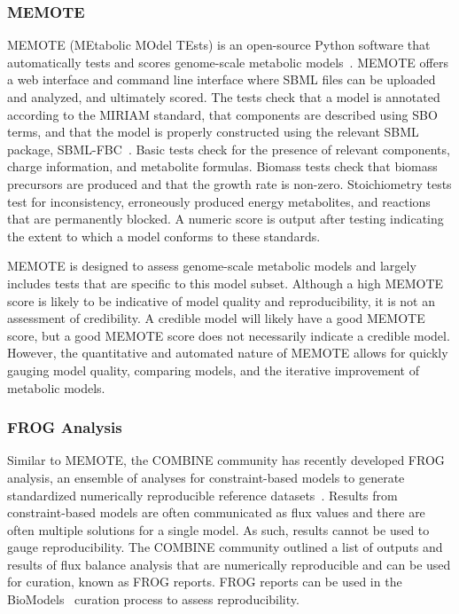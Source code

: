 \documentclass[12pt]{report}
\begin{document}
\subsubsection{MEMOTE}
MEMOTE (MEtabolic MOdel TEsts) is an open-source Python software that automatically tests and scores genome-scale metabolic models~\cite{Lieven2020-kj}. MEMOTE offers a web interface and command line interface where SBML files can be uploaded and analyzed, and ultimately scored. The tests check that a model is annotated according to the MIRIAM standard, that components are described using SBO terms, and that the model is properly constructed using the relevant SBML package, SBML-FBC~\cite{Lieven2020-kj, Olivier2018-tx}. Basic tests check for the presence of relevant components, charge information, and metabolite formulas. Biomass tests check that biomass precursors are produced and that the growth rate is non-zero. Stoichiometry tests test for inconsistency, erroneously produced energy metabolites, and reactions that are permanently blocked. A numeric score is output after testing indicating the extent to which a model conforms to these standards.

MEMOTE is designed to assess genome-scale metabolic models and largely includes tests that are specific to this model subset. Although a high MEMOTE score is likely to be indicative of model quality and reproducibility, it is not an assessment of credibility. A credible model will likely have a good MEMOTE score, but a good MEMOTE score does not necessarily indicate a credible model. However, the quantitative and automated nature of MEMOTE allows for quickly gauging model quality, comparing models, and the iterative improvement of metabolic models.

\subsubsection{FROG Analysis}
Similar to MEMOTE, the COMBINE community has recently developed FROG analysis, an ensemble of analyses for constraint-based models to generate standardized numerically reproducible reference datasets~\cite{sbmlsim21}. Results from constraint-based models are often communicated as flux values and there are often multiple solutions for a single model. As such, results cannot be used to gauge reproducibility. The COMBINE community outlined a list of outputs and results of flux balance analysis that are numerically reproducible and can be used for curation, known as FROG reports. FROG reports can be used in the BioModels~\cite{BioModels2018a, BioModels2020} curation process to assess reproducibility.
\end{document}
